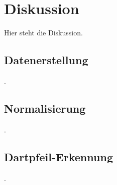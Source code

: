 
\chapter{Diskussion}
\label{cha:diskussion}

Hier steht die Diskussion.

\section{Datenerstellung}
\label{sec:diskussion:daten}

.

\section{Normalisierung}
\label{sec:diskussion:cv}

.

\section{Dartpfeil-Erkennung}
\label{sec:diskussion:ki}

.
